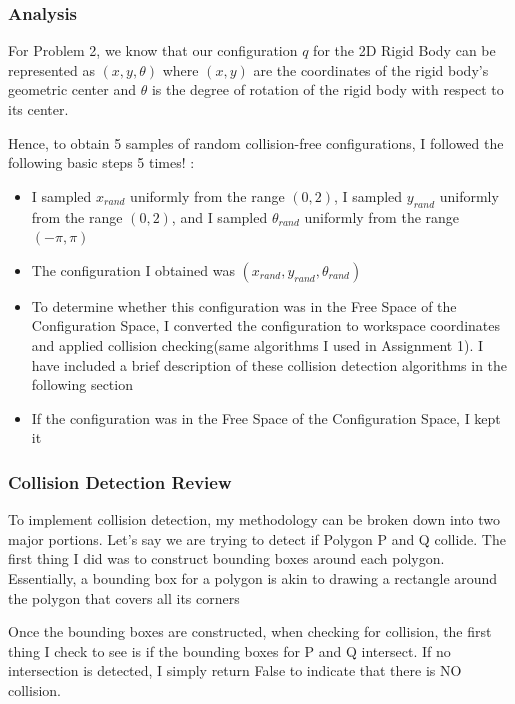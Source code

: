 \documentclass{article}
\begin{document}
\newpage 
\subsubsection{Analysis}
For Problem 2, we know that our configuration $q$ for the 2D Rigid Body can be represented as $(x, y, \theta)$ where $(x, y)$ are the coordinates of the rigid body's geometric center and $\theta$ is the degree of rotation of the rigid body with respect to its center. 

Hence, to obtain 5 samples of random collision-free configurations, I followed the following basic steps 5 times! : 
\begin{itemize}
    \item I sampled $x_{rand}$ uniformly from the range $(0, 2)$, I sampled $y_{rand}$ uniformly from the range $(0, 2)$, and I sampled $\theta_{rand}$ uniformly from the range $(-\pi, \pi)$
    \item The configuration I obtained was $(x_{rand}, y_{rand}, \theta_{rand})$
    \item To determine whether this configuration was in the Free Space of the Configuration Space, I converted the configuration to workspace coordinates and applied collision checking(same algorithms I used in Assignment 1). I have included a brief description of these collision detection algorithms in the following section
    \item If the configuration was in the Free Space of the Configuration Space, I kept it
\end{itemize}

\subsubsection{Collision Detection Review}
To implement collision detection, my methodology can be broken down into two major portions. Let's say we are trying to detect if Polygon P and Q collide. The first thing I did was to construct bounding boxes around each polygon. Essentially, a bounding box for a polygon is akin to drawing a rectangle around the polygon that covers all its corners \newline 

Once the bounding boxes are constructed, when checking for collision, the first thing I check to see is if the bounding boxes for P and Q intersect. If no intersection is detected, I simply return False to indicate that there is NO collision. \newline 
\end{document}
